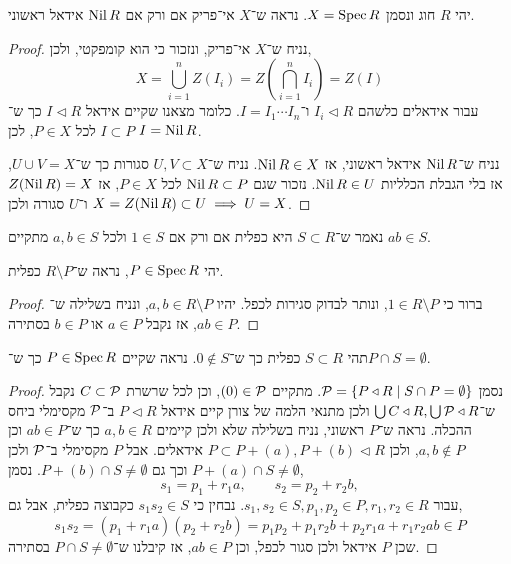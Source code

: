 \question{}
יהי $R$ חוג ונסמן $X = \operatorname{Spec} R$.
נראה ש־$X$ אי־פריק אם ורק אם $\operatorname{Nil} R$ אידאל ראשוני.
\begin{proof}
	נניח ש־$X$ אי־פריק, ונזכור כי הוא קומפקטי, ולכן,
	\[
		X
		= \bigcup_{i = 1}^n Z(I_i)
		= Z(\bigcap_{i = 1}^n I_i)
		= Z(I)
	\]
	עבור אידאלים כלשהם $I_i \triangleleft R$ ו־$I = I_1 \cdots I_n$.
	כלומר מצאנו שקיים אידאל $I \triangleleft R$ כך ש־$I \subset P$ לכל $P \in X$, לכן $I = \operatorname{Nil} R$.

	נניח ש־$\operatorname{Nil} R$ אידאל ראשוני, אז $\operatorname{Nil} R \in X$.
	נניח ש־$U, V \subset X$ סגורות כך ש־$U \cup V = X$, אז בלי הגבלת הכלליות $\operatorname{Nil} R \in U$.
	נזכור שגם $\operatorname{Nil} R \subset P$ לכל $P \in X$, אז $Z(\operatorname{Nil} R) = X$ ו־$U$ סגורה ולכן $X = Z(\operatorname{Nil} R) \subset U \implies U = X$.
\end{proof}

\question{}
נאמר ש־$S \subset R$ היא כפלית אם ורק אם $1 \in S$ ולכל $a, b \in S$ מתקיים $a b \in S$.

\subquestion{}
יהי $P \in \operatorname{Spec} R$, נראה ש־$R \setminus P$ כפלית.
\begin{proof}
	ברור כי $1 \in R \setminus P$, ונותר לבדוק סגירות לכפל.
	יהיו $a, b \in R \setminus P$, ונניח בשלילה ש־$a b \in P$, אז נקבל $a \in P$ או $b \in P$ בסתירה.
\end{proof}

\subquestion{}
תהי $S \subset R$ כפלית כך ש־$0 \notin S$.
נראה שקיים $P \in \operatorname{Spec} R$ כך ש־$P \cap S = \emptyset$.
\begin{proof}
	נסמן $\mathcal{P} = \{ P \triangleleft R \mid S \cap P = \emptyset \}$.
	מתקיים $(0) \in \mathcal{P}$, וכן לכל שרשרת $C \subset \mathcal{P}$ נקבל ש־$\bigcup C \triangleleft R, \bigcup \mathcal{P} \triangleleft R$ ולכן מתנאי הלמה של צורן קיים אידאל $P \triangleleft R$ ב־$\mathcal{P}$ מקסימלי ביחס ההכלה.
	נראה ש־$P$ ראשוני, נניח בשלילה שלא ולכן קיימים $a, b \in R$ כך ש־$a b \in P$ וכן $a, b \notin P$, ולכן $P \subset P + (a), P + (b) \triangleleft R$ אידאלים.
	אבל $P$ מקסימלי ב־$\mathcal{P}$ ולכן $P + (a) \cap S \ne \emptyset$ וכך גם $P + (b) \cap S \ne \emptyset$.
	נסמן,
	\[
		s_1 = p_1 + r_1 a,
		\qquad
		s_2 = p_2 + r_2 b,
	\]
	עבור $s_1, s_2 \in S, p_1, p_2 \in P, r_1, r_2 \in R$.
	נבחין כי $s_1 s_2 \in S$ כקבוצה כפלית, אבל גם,
	\[
		s_1 s_2
		= (p_1 + r_1 a) (p_2 + r_2 b)
		= p_1 p_2 + p_1 r_2 b + p_2 r_1 a + r_1 r_2 a b
		\in P
	\]
	שכן $P$ אידאל ולכן סגור לכפל, וכן $a b \in P$, אז קיבלנו ש־$P \cap S \ne \emptyset$ בסתירה.
\end{proof}


